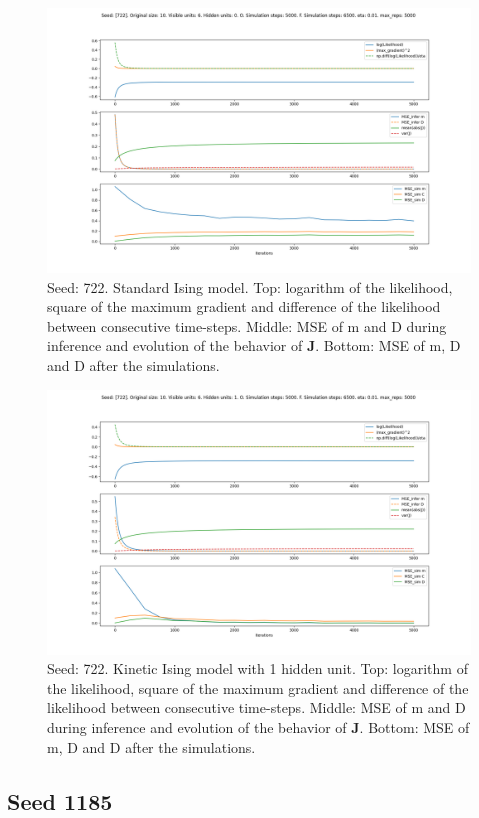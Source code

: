 \documentclass{article}
\def\*#1{\mathbf{#1}}
\begin{document}
\begin{figure}[!htb]
    \centering
    \includegraphics[width=0.7\linewidth]{images/sqrt_size/[722]_10_6_0_5000_6500_eta001_5000_100.png}
\caption{Seed: 722. Standard Ising model. Top: logarithm of the likelihood, square of the maximum gradient and difference of the likelihood between consecutive time-steps. Middle: MSE of m and D during inference and evolution of the behavior of $\*J$. Bottom: MSE of m, D and D after the simulations.}
\end{figure}


\begin{figure}[!htb]
    \centering
    \includegraphics[width=0.7\linewidth]{images/sqrt_size/[722]_10_6_1_5000_6500_eta001_5000_100.png}
\caption{Seed: 722. Kinetic Ising model with 1 hidden unit. Top: logarithm of the likelihood, square of the maximum gradient and difference of the likelihood between consecutive time-steps. Middle: MSE of m and D during inference and evolution of the behavior of $\*J$. Bottom: MSE of m, D and D after the simulations.}
\end{figure}


\newpage
\subsection{Seed 1185}
\end{document}
